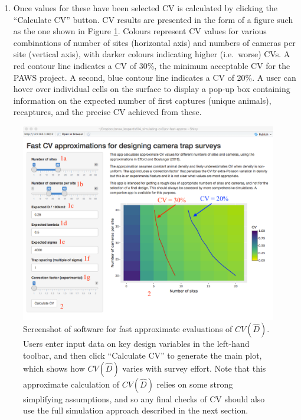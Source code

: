 \documentclass[a4paper,11pt]{article} %
\begin{document}
\begin{enumerate}
\begin{enumerate}
\end{enumerate}
\item Once values for these have been selected CV is calculated by clicking the ``Calculate CV'' button. CV results are presented in the form of a figure such as the one shown in Figure \ref{cva-1}. Colours represent CV values for various combinations of number of sites (horizontal axis) and numbers of cameras per site (vertical axis), with darker colours indicating higher (i.e.\ worse) CVs. A red contour line indicates a CV of 30\%, the minimum acceptable CV for the PAWS project. A second, blue contour line indicates a CV of 20\%. A user can hover over individual cells on the surface to display a pop-up box containing information on the expected number of first captures (unique animals), recaptures, and the precise CV achieved from these.
\end{enumerate}

\begin{figure}[htbp]
\centering
\includegraphics[width=\textwidth]{cv-approx-1}
\caption{Screenshot of software for fast approximate evaluations of $CV(\hat{D})$. Users enter input data on key design variables in the left-hand toolbar, and then click ``Calculate CV'' to generate the main plot, which shows how $CV(\hat{D})$ varies with survey effort. Note that this approximate calculation of $CV(\hat{D})$ relies on some strong simplifying assumptions, and so any final checks of CV should also use the full simulation approach described in the next section.}
\label{cva-1}
\end{figure} 
\end{document}
